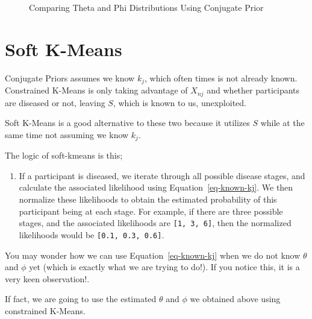 \documentclass[
  letterpaper,
  DIV=11,
  numbers=noendperiod]{scrreprt}
\providecommand{\tightlist}{%
  \setlength{\itemsep}{0pt}\setlength{\parskip}{0pt}}\usepackage{longtable,booktabs,array}
\begin{document}
\begin{figure}[H]


\caption{\label{fig-estdistparamscp}Comparing Theta and Phi
Distributions Using Conjugate Prior}

\end{figure}%

\section{Soft K-Means}\label{sec-soft-kmeans}

Conjugate Priors assumes we know \(k_j\), which often times is not
already known. Constrained K-Means is only taking advantage of
\(X_{nj}\) and whether participants are diseased or not, leaving \(S\),
which is known to us, unexploited.

Soft K-Means is a good alternative to these two because it utilizes
\(S\) while at the same time not assuming we know \(k_j\).

The logic of soft-kmeans is this;

\begin{enumerate}
\def\labelenumi{\arabic{enumi}.}
\tightlist
\item
  If a participant is diseased, we iterate through all possible disease
  stages, and calculate the associated likelihood using
  Equation~\ref{eq-known-kj}. We then normalize these likelihoods to
  obtain the estimated probability of this participant being at each
  stage. For example, if there are three possible stages, and the
  associated likelihoods are \texttt{{[}1,\ 3,\ 6{]}}, then the
  normalized likelihoods would be \texttt{{[}0.1,\ 0.3,\ 0.6{]}}.
\end{enumerate}

\begin{tcolorbox}[enhanced jigsaw, bottomrule=.15mm, colback=white, bottomtitle=1mm, titlerule=0mm, arc=.35mm, breakable, rightrule=.15mm, opacityback=0, leftrule=.75mm, opacitybacktitle=0.6, colframe=quarto-callout-tip-color-frame, coltitle=black, toptitle=1mm, colbacktitle=quarto-callout-tip-color!10!white, title=\textcolor{quarto-callout-tip-color}{\faLightbulb}\hspace{0.5em}{Tip}, left=2mm, toprule=.15mm]

You may wonder how we can use Equation~\ref{eq-known-kj} when we do not
know \(\theta\) and \(\phi\) yet (which is exactly what we are trying to
do!). If you notice this, it is a very keen observation!.

If fact, we are going to use the estimated \(\theta\) and \(\phi\) we
obtained above using constrained K-Means.

\end{tcolorbox}
\end{document}
